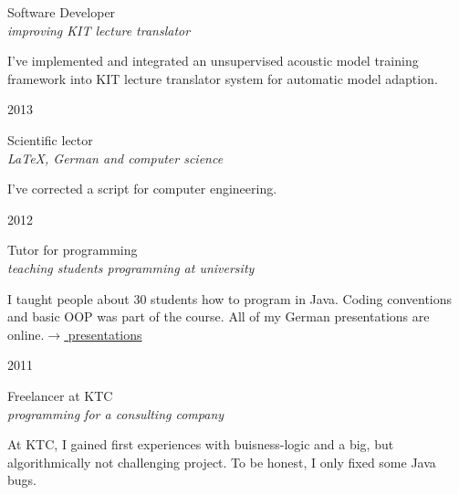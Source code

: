 \documentclass[a4paper,10pt]{article} %
\begin{document}
{\begin{minipage}[t]{0.5\textwidth}
{\raggedright\large Software Developer\\
\textit{improving KIT lecture translator}\\[5pt]}

\normalsize{I've implemented and integrated an unsupervised acoustic model training framework into KIT lecture translator system for automatic model adaption.}\\


{\raggedleft\textsc{2013}\par}

{\raggedright\large Scientific lector\\
\textit{\LaTeX{}, German and computer science}\\[5pt]}

\normalsize{I've corrected a script for computer engineering.}\\


{\raggedleft\textsc{2012}\par}

{\raggedright\large Tutor for programming\\
\textit{teaching students programming at university}\\[5pt]}

\normalsize{I taught people about 30 students how to program in Java.
Coding conventions and basic OOP was part of the course. All of my German presentations are online.}\hfill \href{http://martin-thoma.com/programmieren-tutorium/#Folien}{$\rightarrow$ presentations}\\


{\raggedleft\textsc{2011}\par}

{\raggedright\large Freelancer at KTC\\
\textit{programming for a consulting company}\\[5pt]}

\normalsize{At KTC, I gained first experiences with buisness-logic
and a big, but algorithmically not challenging project. To be honest,
I only fixed some Java bugs.}\\


\end{minipage}}
\end{document}

